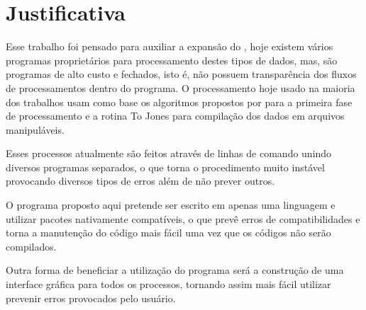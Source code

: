 \chapter{Justificativa}
\label{cap-justificativa}

    Esse trabalho foi pensado para auxiliar a expansão do \MT, hoje existem vários programas proprietários para processamento destes tipos de dados, mas, são programas de alto custo e fechados, isto é, não possuem transparência dos fluxos de processamentos dentro do programa. O processamento hoje usado na maioria dos trabalhos usam como base os algoritmos propostos por \citeauthor{egbert97} para a primeira fase de processamento e a rotina To Jones \cite{egbert97} para compilação dos dados em arquivos manipuláveis.
    
    Esses processos atualmente são feitos através de linhas de comando unindo diversos programas separados, o que torna o procedimento muito instável provocando diversos tipos de erros além de não prever outros. %
    
    O programa proposto aqui pretende ser escrito em apenas uma linguagem e utilizar pacotes nativamente compatíveis, o que prevê erros de compatibilidades e torna a manutenção do código mais fácil uma vez que os códigos não serão compilados.
    
    Outra forma de beneficiar a utilização do programa será a construção de uma interface gráfica para todos os processos, tornando assim mais fácil utilizar prevenir erros provocados pelo usuário.    
    
    
